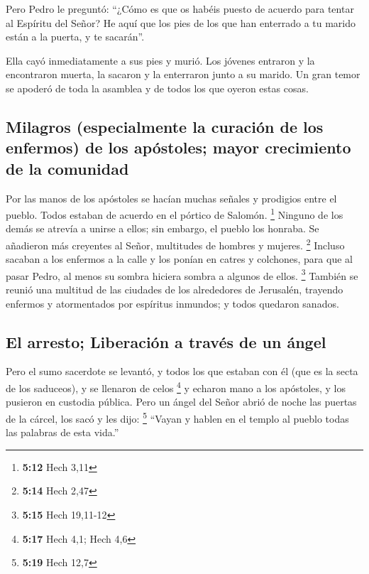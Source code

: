  Pero Pedro le preguntó: ``¿Cómo es que os habéis puesto
de acuerdo para tentar al Espíritu del Señor? He aquí que los pies de
los que han enterrado a tu marido están a la puerta, y te sacarán''.

 Ella cayó inmediatamente a sus pies y murió. Los jóvenes
entraron y la encontraron muerta, la sacaron y la enterraron junto a su
marido.  Un gran temor se apoderó de toda la asamblea y
de todos los que oyeron estas cosas.

\hypertarget{milagros-especialmente-la-curaciuxf3n-de-los-enfermos-de-los-apuxf3stoles-mayor-crecimiento-de-la-comunidad}{%
\subsection{Milagros (especialmente la curación de los enfermos) de los
apóstoles; mayor crecimiento de la
comunidad}\label{milagros-especialmente-la-curaciuxf3n-de-los-enfermos-de-los-apuxf3stoles-mayor-crecimiento-de-la-comunidad}}

 Por las manos de los apóstoles se hacían muchas señales
y prodigios entre el pueblo. Todos estaban de acuerdo en el pórtico de
Salomón. \footnote{\textbf{5:12} Hech 3,11}  Ninguno de
los demás se atrevía a unirse a ellos; sin embargo, el pueblo los
honraba.  Se añadieron más creyentes al Señor, multitudes
de hombres y mujeres. \footnote{\textbf{5:14} Hech 2,47} 
Incluso sacaban a los enfermos a la calle y los ponían en catres y
colchones, para que al pasar Pedro, al menos su sombra hiciera sombra a
algunos de ellos. \footnote{\textbf{5:15} Hech 19,11-12} 
También se reunió una multitud de las ciudades de los alrededores de
Jerusalén, trayendo enfermos y atormentados por espíritus inmundos; y
todos quedaron sanados.

\hypertarget{el-arresto-liberaciuxf3n-a-travuxe9s-de-un-uxe1ngel}{%
\subsection{El arresto; Liberación a través de un
ángel}\label{el-arresto-liberaciuxf3n-a-travuxe9s-de-un-uxe1ngel}}

 Pero el sumo sacerdote se levantó, y todos los que
estaban con él (que es la secta de los saduceos), y se llenaron de celos
\footnote{\textbf{5:17} Hech 4,1; Hech 4,6}  y echaron
mano a los apóstoles, y los pusieron en custodia pública.
 Pero un ángel del Señor abrió de noche las puertas de la
cárcel, los sacó y les dijo: \footnote{\textbf{5:19} Hech 12,7}
 ``Vayan y hablen en el templo al pueblo todas las
palabras de esta vida.''


